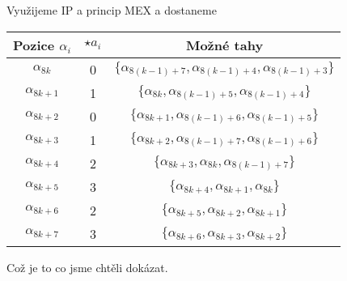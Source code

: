 \documentclass[../main.tex]{subfiles}
\begin{document}
Využijeme IP a princip MEX a dostaneme

\begin{center}
    \begin{tabular}{|c|c|c|}
        \hline
        Pozice $\alpha_i$ & $\star a_i$ & Možné tahy \\
        \hline
        $\alpha_{8k}$ & 0 & $\{ \alpha_{8(k-1)+7},  \alpha_{8(k-1)+4}, \alpha_{8(k-1)+3} \}$ \\
        \hline
        $\alpha_{8k+1}$ & 1 & $\{ \alpha_{8k},  \alpha_{8(k-1)+5}, \alpha_{8(k-1)+4} \}$ \\
        \hline
        $\alpha_{8k+2}$ & 0 & $\{ \alpha_{8k+1},  \alpha_{8(k-1)+6}, \alpha_{8(k-1)+5} \}$ \\
        \hline
        $\alpha_{8k+3}$ & 1 & $\{ \alpha_{8k+2},  \alpha_{8(k-1)+7}, \alpha_{8(k-1)+6} \}$ \\
        \hline
        $\alpha_{8k+4}$ & 2 & $\{ \alpha_{8k+3},  \alpha_{8k}, \alpha_{8(k-1)+7} \}$ \\
        \hline
        $\alpha_{8k+5}$ & 3 & $\{ \alpha_{8k+4},  \alpha_{8k+1}, \alpha_{8k} \}$ \\
        \hline
        $\alpha_{8k+6}$ & 2 & $\{ \alpha_{8k+5},  \alpha_{8k+2}, \alpha_{8k+1} \}$ \\
        \hline
        $\alpha_{8k+7}$ & 3 & $\{ \alpha_{8k+6},  \alpha_{8k+3}, \alpha_{8k+2} \}$ \\
        \hline
    \end{tabular}

\end{center}


Což je to co jsme chtěli dokázat. 
\end{document}
